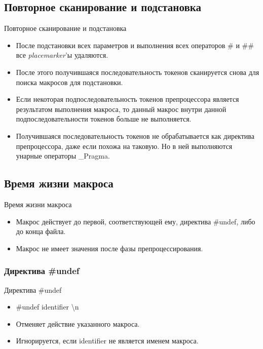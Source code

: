     \subsection{Повторное сканирование и подстановка}
    \begin{frame}{Повторное сканирование и подстановка}
        \begin{itemize}
            \item После подстановки всех параметров и выполнения всех операторов \# и \#\# все \textit{placemarker}'ы удаляются.
            \item После этого получившаяся последовательность токенов сканируется снова для поиска макросов для подстановки.
            \item Если некоторая подпоследовательность токенов препроцессора является результатом выполнения макроса,
                то данный макрос внутри данной подпоследовательности токенов больше не выполняется.
            \item Получившаяся последовательность токенов не обрабатывается как директива препроцессора,
                даже если похожа на таковую. Но в ней выполняются унарные операторы \_Pragma.
        \end{itemize}
    \end{frame}
    \subsection{Время жизни макроса}
    \begin{frame}{Время жизни макроса}
        \begin{itemize}
            \item Макрос действует до первой, соответствующей ему, директива \#undef, либо до конца файла.
            \item Макрос не имеет значения после фазы препроцессирования.
        \end{itemize}
    \end{frame}
    \subsubsection{Директива \#undef}
    \begin{frame}{Директива \#undef}
        \begin{itemize}
            \item \#undef identifier \textbackslash{n}
            \item Отменяет действие указанного макроса.
            \item Игнорируется, если identifier не является именем макроса.
        \end{itemize}
    \end{frame}
